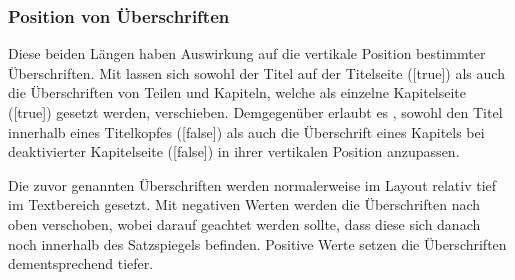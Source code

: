 \subsubsection{Position von Überschriften}
\begin{Declaration}[v2.02]{}
\begin{Declaration}[v2.02]{}
\printdeclarationlist%
%
%
%
%
Diese beiden Längen haben Auswirkung auf die vertikale Position bestimmter
Überschriften. Mit  lassen sich sowohl der Titel auf
der Titelseite ([true]) als auch die Überschriften von Teilen 
und Kapiteln, welche als einzelne Kapitelseite ([true]) 
gesetzt werden, verschieben. Demgegenüber erlaubt es , 
sowohl den Titel innerhalb eines Titelkopfes ([false]) als 
auch die Überschrift eines Kapitels bei deaktivierter Kapitelseite 
([false]) in ihrer vertikalen Position anzupassen.

Die zuvor genannten Überschriften werden normalerweise im Layout relativ tief 
im Textbereich gesetzt. Mit negativen Werten werden die Überschriften nach oben 
verschoben, wobei darauf geachtet werden sollte, dass diese sich danach noch 
innerhalb des Satzspiegels befinden. Positive Werte setzen die Überschriften 
dementsprechend tiefer.
\end{Declaration}
\end{Declaration}



